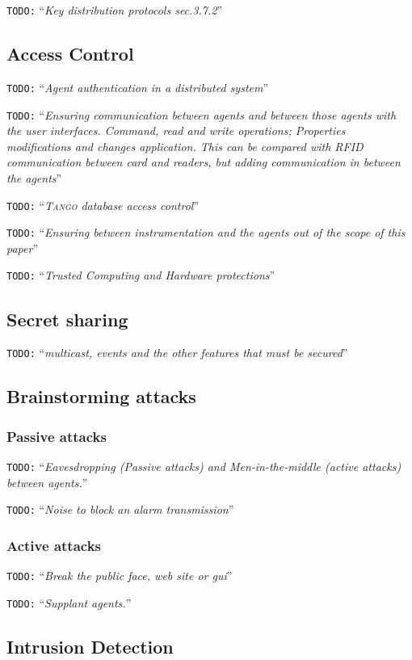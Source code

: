 \documentclass[10pt,a4paper,twoside]{llncs}
\newcommand{\todo}[1]{\texttt{\color{red}TODO:} ``\emph{#1}''}
\newcommand{\tango}{\textsc{Tango} }
\begin{document}
\todo{Key distribution protocols \cite{SecEngRossAnderson} sec.3.7.2}

%
\subsection{Access Control}

\todo{Agent authentication in a distributed system}

\todo{Ensuring communication between agents and between those agents with the user interfaces. \emph{Command}, \emph{read} and \emph{write} operations; \emph{Properties} modifications and changes application. This can be compared with \emph{RFID} communication between card and readers, but adding communication in between the agents}

\todo{\tango database access control}

\todo{Ensuring between instrumentation and the agents out of the scope of this paper}

\todo{Trusted Computing and Hardware protections}
%
\subsection{Secret sharing}

\todo{multicast, events and the other features that must be secured}

%
\subsection{Brainstorming attacks}

%
\subsubsection{Passive attacks}

\todo{Eavesdropping (Passive attacks) and Men-in-the-middle (active attacks) between agents.}

\todo{Noise to block an alarm transmission}

%
\subsubsection{Active attacks}

\todo{Break the public face, web site or gui}

\todo{Supplant agents.}

%
\subsection{Intrusion Detection}
\end{document}
